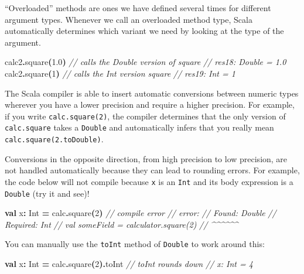 \documentclass[11pt,a5paper,]{book}
\newenvironment{Shaded}{\begin{snugshade}}{\end{snugshade}}
\newcommand{\BuiltInTok}[1]{#1}
\newcommand{\CommentTok}[1]{\textcolor[rgb]{0.56,0.35,0.01}{\textit{#1}}}
\newcommand{\DecValTok}[1]{\textcolor[rgb]{0.00,0.00,0.81}{#1}}
\newcommand{\FloatTok}[1]{\textcolor[rgb]{0.00,0.00,0.81}{#1}}
\newcommand{\FunctionTok}[1]{\textcolor[rgb]{0.00,0.00,0.00}{#1}}
\newcommand{\KeywordTok}[1]{\textcolor[rgb]{0.13,0.29,0.53}{\textbf{#1}}}
\newcommand{\NormalTok}[1]{#1}
\newcommand{\OperatorTok}[1]{\textcolor[rgb]{0.81,0.36,0.00}{\textbf{#1}}}
\begin{document}
``Overloaded'' methods are ones we have defined several times for
different argument types. Whenever we call an overloaded method type,
Scala automatically determines which variant we need by looking at the
type of the argument.

\begin{Shaded}
\begin{Highlighting}[]
\NormalTok{calc2}\OperatorTok{.}\FunctionTok{square}\OperatorTok{(}\FloatTok{1.0}\OperatorTok{)} \CommentTok{// calls the \textasciigrave{}Double\textasciigrave{} version of \textasciigrave{}square\textasciigrave{}}
\CommentTok{// res18: Double = 1.0}
\NormalTok{calc2}\OperatorTok{.}\FunctionTok{square}\OperatorTok{(}\DecValTok{1}\OperatorTok{)}   \CommentTok{// calls the \textasciigrave{}Int\textasciigrave{} version \textasciigrave{}square\textasciigrave{}}
\CommentTok{// res19: Int = 1}
\end{Highlighting}
\end{Shaded}

The Scala compiler is able to insert automatic conversions between
numeric types wherever you have a lower precision and require a higher
precision. For example, if you write \texttt{calc.square(2)}, the
compiler determines that the only version of \texttt{calc.square} takes
a \texttt{Double} and automatically infers that you really mean
\texttt{calc.square(2.toDouble)}.

Conversions in the opposite direction, from high precision to low
precision, are not handled automatically because they can lead to
rounding errors. For example, the code below will not compile because
\texttt{x} is an \texttt{Int} and its body expression is a
\texttt{Double} (try it and see)!

\begin{Shaded}
\begin{Highlighting}[]
\KeywordTok{val}\NormalTok{ x}\OperatorTok{:} \BuiltInTok{Int} \OperatorTok{=}\NormalTok{ calc}\OperatorTok{.}\FunctionTok{square}\OperatorTok{(}\DecValTok{2}\OperatorTok{)} \CommentTok{// compile error}
\CommentTok{// error:}
\CommentTok{// Found:    Double}
\CommentTok{// Required: Int}
\CommentTok{// val someField = calculator.square(2)}
\CommentTok{//                            \^{}\^{}\^{}\^{}\^{}\^{}}
\end{Highlighting}
\end{Shaded}

You can manually use the \texttt{toInt} method of \texttt{Double} to
work around this:

\begin{Shaded}
\begin{Highlighting}[]
\KeywordTok{val}\NormalTok{ x}\OperatorTok{:} \BuiltInTok{Int} \OperatorTok{=}\NormalTok{ calc}\OperatorTok{.}\FunctionTok{square}\OperatorTok{(}\DecValTok{2}\OperatorTok{).}\NormalTok{toInt }\CommentTok{// toInt rounds down}
\CommentTok{// x: Int = 4}
\end{Highlighting}
\end{Shaded}
\end{document}
